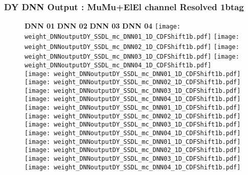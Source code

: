 \documentclass[9pt]{beamer}
\begin{document}
\begin{frame}
	\frametitle{DY DNN Output : MuMu+ElEl channel Resolved 1btag}
	\begin{figure}
	    \textbf{DNN 01} \hspace{1.2cm} \textbf{DNN 02} \hspace{1.2cm} \textbf{DNN 03} \hspace{1.2cm} \textbf{DNN 04}
        \centering
		\texttt{[image: weight\_DNNoutputDY\_SSDL\_mc\_DNN01\_1D\_CDFShift1b.pdf]}
		\texttt{[image: weight\_DNNoutputDY\_SSDL\_mc\_DNN02\_1D\_CDFShift1b.pdf]}
		\texttt{[image: weight\_DNNoutputDY\_SSDL\_mc\_DNN03\_1D\_CDFShift1b.pdf]}
		\texttt{[image: weight\_DNNoutputDY\_SSDL\_mc\_DNN04\_1D\_CDFShift1b.pdf]}\\
		\texttt{[image: weight\_DNNoutputDY\_SSDL\_mc\_DNN01\_1D\_CDFShift1b.pdf]}
		\texttt{[image: weight\_DNNoutputDY\_SSDL\_mc\_DNN02\_1D\_CDFShift1b.pdf]}
		\texttt{[image: weight\_DNNoutputDY\_SSDL\_mc\_DNN03\_1D\_CDFShift1b.pdf]}
		\texttt{[image: weight\_DNNoutputDY\_SSDL\_mc\_DNN04\_1D\_CDFShift1b.pdf]}\\
		\texttt{[image: weight\_DNNoutputDY\_SSDL\_mc\_DNN01\_1D\_CDFShift1b.pdf]}
		\texttt{[image: weight\_DNNoutputDY\_SSDL\_mc\_DNN02\_1D\_CDFShift1b.pdf]}
		\texttt{[image: weight\_DNNoutputDY\_SSDL\_mc\_DNN03\_1D\_CDFShift1b.pdf]}
		\texttt{[image: weight\_DNNoutputDY\_SSDL\_mc\_DNN04\_1D\_CDFShift1b.pdf]}\\
		\texttt{[image: weight\_DNNoutputDY\_SSDL\_mc\_DNN01\_1D\_CDFShift1b.pdf]}
		\texttt{[image: weight\_DNNoutputDY\_SSDL\_mc\_DNN02\_1D\_CDFShift1b.pdf]}
		\texttt{[image: weight\_DNNoutputDY\_SSDL\_mc\_DNN03\_1D\_CDFShift1b.pdf]}
		\texttt{[image: weight\_DNNoutputDY\_SSDL\_mc\_DNN04\_1D\_CDFShift1b.pdf]}\\
	\end{figure}
\end{frame}
\end{document}
